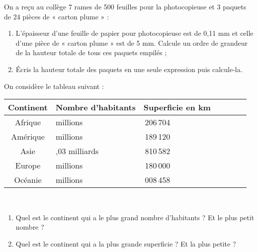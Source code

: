 \begin{exercice}
On a reçu au collège 7 rames de 500 feuilles pour la photocopieuse et 3 paquets de 24 pièces de « carton plume » :
\begin{enumerate}
 \item L'épaisseur d'une feuille de papier pour photocopieuse est de 0,11 mm et celle d'une pièce de « carton plume » est de 5 mm. Calcule un ordre de grandeur de la hauteur totale de tous ces paquets empilés ;
 \item Écris la hauteur totale des paquets en une seule expression puis calcule‑la.
 \end{enumerate}
\end{exercice}


\begin{exercice}
On considère le tableau suivant :

\begin{center}
\begin{tabularx}{\linewidth}{|c|*{6}{>{\centering \arraybackslash}X|}}
\hline \rowcolor{U1} Continent & Nombre d'habitants & Superficie en km\up{2} \\
\hline \rowcolor{A3} Afrique & 965 millions & 30\,206\,704 \\
\hline \rowcolor{A3} Amérique & 911 millions & 42\,189\,120 \\
\hline \rowcolor{A3} Asie & 4,03 milliards & 43\,810\,582 \\
\hline \rowcolor{A3} Europe & 731 millions & 10\,180\,000 \\
\hline \rowcolor{A3} Océanie & 34 millions & 9\,008\,458 \\
\hline
\end{tabularx} \\
\end{center}

\begin{enumerate}
 \item Quel est le continent qui a le plus grand nombre d'habitants ? Et le plus petit nombre ?
 \item Quel est le continent qui a la plus grande superficie ? Et la plus petite ? 
 \end{enumerate}
\end{exercice}



